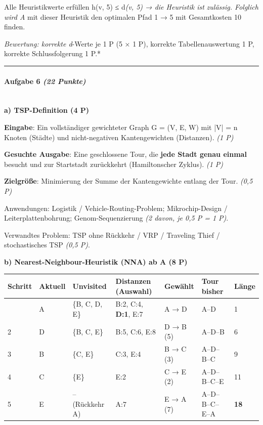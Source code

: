 \documentclass[11pt, a4paper]{article}
\begin{document}
Alle Heuristikwerte erfüllen h(v, 5) ≤ d\textit{(v, 5) → die Heuristik ist }\textit{zulässig}\textit{. Folglich wird A} mit dieser Heuristik den optimalen Pfad 1 → 5 mit Gesamtkosten 10 finden.


\textit{Bewertung: korrekte d}-Werte je 1 P (5 × 1 P), korrekte Tabellenauswertung 1 P, korrekte Schlussfolgerung 1 P.*



\noindent\textcolor{rulegray}{\rule{\linewidth}{0.4pt}}


\paragraph{Aufgabe 6 \textit{(22 Punkte)}}\mbox{}\\[2pt]

\textbf{a) TSP-Definition (4 P)}


\textbf{Eingabe}: Ein vollständiger gewichteter Graph G = (V, E, W) mit |V| = n Knoten (Städte) und nicht-negativen Kantengewichten (Distanzen). \textit{(1 P)}

\textbf{Gesuchte Ausgabe}: Eine geschlossene Tour, die \textbf{jede Stadt genau einmal} besucht und zur Startstadt zurückkehrt (Hamiltonscher Zyklus). \textit{(1 P)}

\textbf{Zielgröße}: Minimierung der Summe der Kantengewichte entlang der Tour. \textit{(0,5 P)}


Anwendungen: Logistik / Vehicle-Routing-Problem; Mikrochip-Design / Leiterplattenbohrung; Genom-Sequenzierung \textit{(2 davon, je 0,5 P = 1 P)}.

Verwandtes Problem: TSP ohne Rückkehr / VRP / Traveling Thief / stochastisches TSP \textit{(0,5 P)}.


\textbf{b) Nearest-Neighbour-Heuristik (NNA) ab A (8 P)}



{\footnotesize
\begin{tabularx}{\linewidth}{XXXXXXX}
\hline
\rowcolor{tableheadbg}
{\color{white}\textbf{Schritt}} & {\color{white}\textbf{Aktuell}} & {\color{white}\textbf{Unvisited}} & {\color{white}\textbf{Distanzen (Auswahl)}} & {\color{white}\textbf{Gewählt}} & {\color{white}\textbf{Tour bisher}} & {\color{white}\textbf{Länge}} \\[2pt]
\hline
\endhead
\hline
\endfoot
1 & A & \{B, C, D, E\} & B:2, C:4, \textbf{D:1}, E:7 & A → D & A–D & 1 \\
2 & D & \{B, C, E\} & B:5, C:6, E:8 & D → B (5) & A–D–B & 6 \\
3 & B & \{C, E\} & C:3, E:4 & B → C (3) & A–D–B–C & 9 \\
4 & C & \{E\} & E:2 & C → E (2) & A–D–B–C–E & 11 \\
5 & E & – (Rückkehr A) & A:7 & E → A (7) & A–D–B–C–E–A & \textbf{18} \\
\end{tabularx}
}
\end{document}
